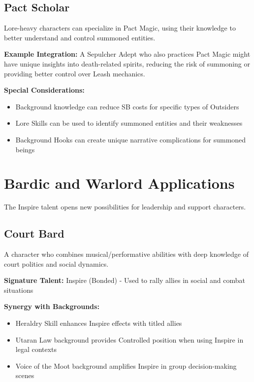 \subsection{Pact Scholar}
Lore-heavy characters can specialize in Pact Magic, using their knowledge to better understand and control summoned entities.

\textbf{Example Integration:} A Sepulcher Adept who also practices Pact Magic might have unique insights into death-related spirits, reducing the risk of summoning or providing better control over Leash mechanics.

\textbf{Special Considerations:}
\begin{itemize}
    \item Background knowledge can reduce SB costs for specific types of Outsiders
    \item Lore Skills can be used to identify summoned entities and their weaknesses
    \item Background Hooks can create unique narrative complications for summoned beings
\end{itemize}

\section{Bardic and Warlord Applications}

The Inspire talent opens new possibilities for leadership and support characters.

\subsection{Court Bard}
A character who combines musical/performative abilities with deep knowledge of court politics and social dynamics.

\textbf{Signature Talent:} Inspire (Bonded) - Used to rally allies in social and combat situations

\textbf{Synergy with Backgrounds:}
\begin{itemize}
    \item Heraldry Skill enhances Inspire effects with titled allies
    \item Utaran Law background provides Controlled position when using Inspire in legal contexts
    \item Voice of the Moot background amplifies Inspire in group decision-making scenes
\end{itemize}

